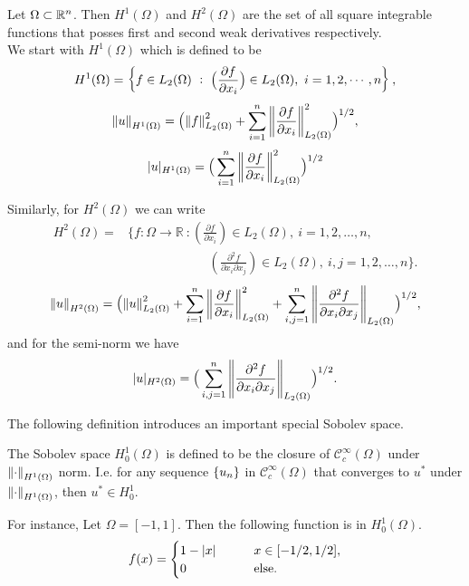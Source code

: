 \begin{example}
	Let $ \Omega \subset \mathbb{R}^n $. Then $ H^1(\Omega) $ and $ H^2(\Omega) $ are the set of all square integrable functions that posses first and second weak derivatives respectively.\\
	We start with $ H^1(\Omega) $ which is defined to be
	\[ H^1(\Omega) = \left\{ f\in L_2(\Omega)\ :\ \big(\frac{\partial f}{\partial x_i}\big) \in L_2(\Omega),\ i=1,2,\cdots,n  \right\},\]
	\[ \norm{u}_{H^1(\Omega)} = \big(\norm{f}^2_{L_2(\Omega)} + \sum_{i=1}^{n}\norm{\frac{\partial f}{\partial x_i}}_{L_2(\Omega)}^2\big)^{1/2}, \] 
	\[ |u|_{H^1(\Omega)} = \big(\sum_{i=1}^{n}\norm{\frac{\partial f}{\partial x_i}}_{L_2(\Omega)}^2\big)^{1/2} \]
	
	Similarly, for $ H^2(\Omega) $ we can write
	\begin{align*}
		H^2(\Omega) = &\{ f:\Omega \to \mathbb{R}\ : (\frac{\partial f}{\partial x_i}) \in L_2(\Omega),\ i=1,2,\ldots,n, \nonumber \\
		&\phantom{{}= \{ f:\Omega \to \mathbb{R}\ :} (\frac{\partial^2 f}{\partial x_i \partial x_j}) \in L_2(\Omega),\ i,j=1,2,\ldots,n \}.
	\end{align*}
	\[ \norm{u}_{H^2(\Omega)} = \big( \norm{u}^2_{L_2(\Omega)} + \sum_{i=1}^{n} \norm{\frac{\partial f}{\partial x_i}}^2_{L_2(\Omega)}  + \sum_{i,j=1}^{n} \norm{\frac{\partial^2 f}{\partial x_i \partial x_j}}_{L_2(\Omega)}\big)^{1/2}, \]
	and for the semi-norm we have
	\[ |u|_{H^2(\Omega)} = \big(\sum_{i,j=1}^{n} \norm{\frac{\partial^2 f}{\partial x_i \partial x_j}}_{L_2(\Omega)}\big)^{1/2}. \]
\end{example}

The following definition introduces an important special Sobolev space.

\begin{definition}
	The Sobolev space $ H_0^1(\Omega) $ is defined to be the closure of $ \mathscr{C}^\infty_c(\Omega) $ under $ \norm{\cdot}_{H^1(\Omega)} $ norm. I.e. for any sequence $ \{u_n\} $ in $ \mathscr{C}^\infty_c(\Omega) $ that converges to $ u^* $ under $ \norm{\cdot}_{H^1(\Omega)} $, then $ u^* \in H_0^1 $.
\end{definition}
\begin{remark}
	For instance, Let $ \Omega = [-1,1] $. Then the following function is in $ H^1_0(\Omega) $.
	\[ 
	f(x) = \begin{cases}
		1-|x| \qquad &x\in[-1/2,1/2],\\
		0 \qquad &\text{else}.
	\end{cases}
	 \]
\end{remark}

